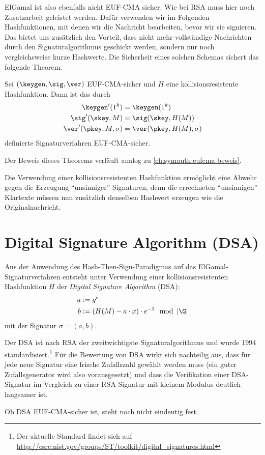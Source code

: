 ElGamal ist also ebenfalls nicht EUF-CMA sicher. Wie bei RSA muss hier noch Zusatzarbeit geleistet werden. Dafür verwenden wir im
Folgenden Hashfunktionen, mit denen wir die Nachricht bearbeiten, bevor wir sie signieren. Das bietet uns zusätzlich den Vorteil, dass
nicht mehr vollständige Nachrichten durch den Signaturalgorithmus geschickt werden, sondern nur noch vergleichsweise kurze Hashwerte. Die Sicherheit eines solchen Schemas sichert das folgende Theorem.~\\

\begin{theorem}
Sei $(\keygen, \sig, \ver)$ EUF-CMA-sicher und $H$ eine kollisionsresistente Hashfunktion. Dann ist das durch 
\begin{align*}
\keygen'(1^k) &= \keygen(1^k)\\
\sig'(\skey,M) &= \sig(\skey,H(M))\\
\ver'(\pkey,M,\sigma) &= \ver(\pkey,H(M),\sigma)
\end{align*}
definierte Signaturverfahren EUF-CMA-sicher.~\\
\end{theorem}

Der Beweis dieses Theorems verläuft analog zu \ref{ch:symauth:eufcma-beweis}.

Die Verwendung einer kollisionsresistenten Hashfunktion ermöglicht eine Abwehr gegen die Erzeugung "`unsinniger"' Signaturen, denn die errechneten "`unsinnigen"' Klartexte müssen nun zusätzlich denselben Hashwert erzeugen wie die Originalnachricht.


\section{Digital Signature Algorithm (DSA)}
Aus der Anwendung des Hash-Then-Sign-Paradigmas auf das ElGamal-Signaturverfahren entsteht unter Verwendung einer kollisionsresistenten
Hashfunktion $H$ der \emph{Digital Signature Algorithm} (DSA):
\begin{align*}
a &:= g^e\\
b &:= (H(M) - a \cdot x) \cdot e^{-1} \mod \left|\G\right|
\end{align*}
mit der Signatur $\sigma = (a,b)$.

Der DSA ist nach RSA der zweitwichtigste Signaturalgorithmus und wurde 1994 standardisiert.\footnote{Der aktuelle Standard findet sich auf \url{http://csrc.nist.gov/groups/ST/toolkit/digital_signatures.html}} Für die Bewertung von DSA wirkt sich nachteilig aus, dass für jede neue Signatur eine frische Zufallszahl gewählt werden muss (ein guter Zufallsgenerator wird also
vorausgesetzt) und dass die Verifikation einer DSA-Signatur im Vergleich zu einer RSA-Signatur mit kleinem Modulus deutlich langsamer ist.

Ob DSA EUF-CMA-sicher ist, steht noch nicht eindeutig fest.
